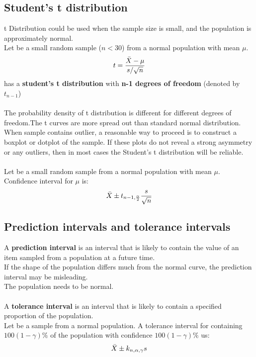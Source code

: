 \documentclass[../main.tex]{subfiles}
\begin{document}
\subsection{Student's t distribution}
t Distribution could be used when the sample size is small, and the population is approximately normal.\\
Let \xotn be a small random sample ($n<30$) from a normal population with mean $\mu$.
\[t=\frac{\bar{X} - \mu}{s/{\sqrt{n}}}\]
has a \textbf{student's t distribution} with \textbf{n-1 degrees of freedom} (denoted by $t_{n-1}$)\\
\\
The probability density of t distribution is different for different degrees of freedom.The t curves are more spread out than standard normal distribution.
When sample contains outlier, a reasonable way to proceed is to construct a boxplot or dotplot of the sample. If these plots do not reveal a strong asymmetry or any outliers, then in most cases the Student's t distribution will be reliable.\\
\\
Let \xotn be a small random sample from a normal population with mean $\mu$. \\
Confidence interval for $\mu$ is:
\[ \bar{X} \pm t_{n-1,\frac{\alpha}{2}}\frac{s}{\sqrt{n}} \]

\subsection{Prediction intervals and tolerance intervals}
A \textbf{prediction interval} is an interval that is likely to contain the value of an item sampled from a population at a future time.\\
If the shape of the population differs much from the normal curve, the prediction interval may be misleading.\\
The population needs to be normal.\\
\\
A \textbf{tolerance interval} is an interval that is likely to contain a specified proportion of the population.\\
Let \xotn be a sample from a normal population. A tolerance interval for containing $100(1-\gamma)\%$ of the population with confidence $100(1-\gamma)\%$ us:
\[
\bar{X} \pm k_{n,\alpha,\gamma}s
\]
\end{document}
